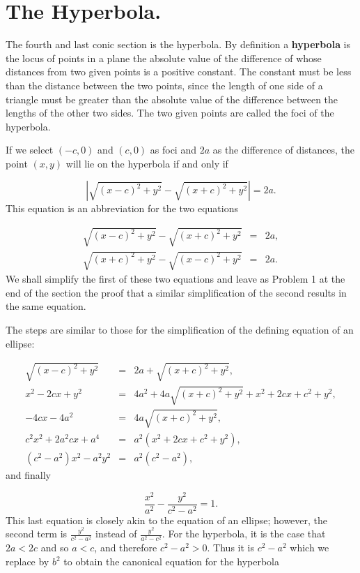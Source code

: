 \section{The Hyperbola.} \label{sec 3.4}
The fourth and last conic section is the hyperbola. By definition a \textbf{hyperbola} is the locus of points in a plane the absolute value of
the difference of whose distances from two given points is a positive constant. The constant must be less than the distance between the two points, since the length of one side of a triangle must be greater than the absolute value of the difference between the lengths of the other two sides. The two given points are called the foci of the hyperbola.

If we select $(-c, 0)$ and $(c, 0)$ as foci and $2a$ as the difference of distances, the point $(x, y)$ will lie on the hyperbola if and only if

$$
|\sqrt{(x - c)^2 + y^2} - \sqrt{(x + c)^2 + y^2} | = 2a.
$$
\noindent This equation is an abbreviation for the two equations

\begin{eqnarray*}
\sqrt{(x - c)^2 + y^2} - \sqrt{(x + c)^2 + y^2}  &=& 2a,\\
\sqrt{(x + c)^2 + y^2} - \sqrt{(x - c)^2 + y^2}  &=& 2a.
\end{eqnarray*}
\noindent We shall simplify the first of these two equations and leave as Problem 1 at the end of the section the proof that a similar simplification of the second results in the same equation.

The steps are similar to those for the simplification of the defining equation of an ellipse:

\begin{eqnarray*}
       \sqrt{(x - c)^2 + y^2}  &=& 2a + \sqrt{(x + c)^2 + y^2},\\
               x^2 - 2cx + y^2 &=& 4a^2 + 4a \sqrt{(x + c)^2 + y^2} + x^2 + 2cx + c^2 + y^2,\\
                      -4cx-4a^2 &=& 4a\sqrt{(x + c)^2 + y^2},\\
c^2x^2 + 2{a^2}cx + a^4  &=& a^2(x^2 + 2cx + c^2 + y^2),\\
(c^2 - a^2)x^2 - {a^2}y^2 &=& a^2(c^2 - a^2), 
\end{eqnarray*}
\noindent and finally

$$
\frac{x^2}{a^2} - \frac{y^2}{c^2 - a^2} = 1. 
$$
\noindent This last equation is closely akin to the equation of an ellipse; however, the second term is $\frac{y^2}{c^2 - a^2}$ instead of $\frac{y^2}{a^2 - c^2}$. For the hyperbola, it is the case that $2a < 2c$ and so $a < c$, and therefore $c^2 - a^2 > 0$. Thus it is $c^2 - a^2$ which we replace by $b^2$ to obtain the canonical equation for the hyperbola

